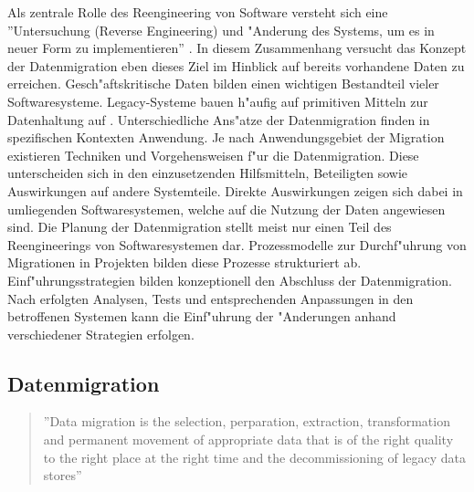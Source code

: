 Als zentrale Rolle des Reengineering von Software versteht sich eine ''Untersuchung (Reverse Engineering) und "Anderung des Systems, um es in neuer Form zu implementieren'' \citep{chikofsky-1990}. In diesem Zusammenhang versucht das Konzept der Datenmigration eben dieses Ziel im Hinblick auf bereits vorhandene Daten zu erreichen. Gesch"aftskritische Daten bilden einen wichtigen Bestandteil vieler Softwaresysteme. Legacy-Systeme bauen h"aufig auf primitiven Mitteln zur Datenhaltung auf \citep{henrard-2002}.
\lb 
Unterschiedliche Ans"atze der Datenmigration finden in spezifischen Kontexten Anwendung. Je nach Anwendungsgebiet der Migration existieren Techniken und Vorgehensweisen f"ur die Datenmigration. Diese unterscheiden sich in den einzusetzenden Hilfsmitteln, Beteiligten sowie Auswirkungen auf andere Systemteile. Direkte Auswirkungen zeigen sich dabei in umliegenden Softwaresystemen, welche auf die Nutzung der Daten angewiesen sind.
\lb
Die Planung der Datenmigration stellt meist nur einen Teil des Reengineerings von Softwaresystemen dar. Prozessmodelle zur Durchf"uhrung von Migrationen in Projekten bilden diese Prozesse strukturiert ab.
\lb
Einf"uhrungsstrategien bilden konzeptionell den Abschluss der Datenmigration. Nach erfolgten Analysen, Tests und entsprechenden Anpassungen in den betroffenen Systemen kann die Einf"uhrung der "Anderungen anhand verschiedener Strategien erfolgen. 

\subsection{Datenmigration}

\begin{quote}''Data migration is the selection, perparation, extraction, transformation and permanent movement of appropriate data that is of the right quality to the right place at the right time and the decommissioning of legacy data stores'' \flushright\citep[S.~7]{morris-2012}
\end{quote}

